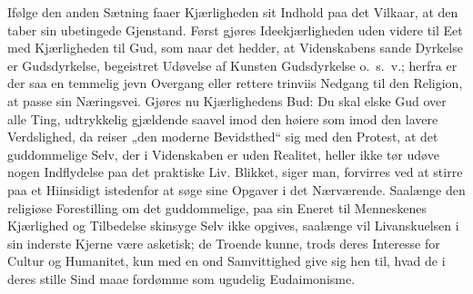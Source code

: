 \documentclass[12pt]{book}
\begin{document}
Ifølge den anden Sætning faaer Kjærligheden sit Indhold paa det
Vilkaar, at den taber sin ubetingede
Gjenstand. Først gjøres Ideekjærligheden uden videre til Eet med
Kjærligheden til Gud, som naar det hedder, at Videnskabens sande
Dyrkelse er Gudsdyrkelse, begeistret Udøvelse af Kunsten
Gudsdyrkelse o.\ s.\ v.; herfra er der saa en temmelig jevn Overgang
eller rettere trinviis Nedgang til den Religion, at passe sin
Næringsvei. Gjøres nu Kjærlighedens Bud: Du skal elske Gud over alle
Ting, udtrykkelig gjældende saavel imod den høiere som imod den
lavere Verdslighed, da reiser „den moderne Bevidsthed“ sig med den
Protest, at det guddommelige Selv, der i Videnskaben er uden
Realitet, heller ikke tør udøve nogen Indflydelse paa det praktiske
Liv. Blikket, siger man, forvirres ved at stirre paa et Hiinsidigt
istedenfor at søge sine Opgaver i det Nærværende. Saalænge den
religiøse Forestilling om det guddommelige, paa sin Eneret til
Menneskenes Kjærlighed og Tilbedelse skinsyge Selv ikke opgives,
saalænge vil Livanskuelsen i sin inderste Kjerne være asketisk; de
Troende kunne, trods deres Interesse for Cultur og Humanitet, kun
med en ond Samvittighed give sig hen til, hvad de i deres stille
Sind maae fordømme som ugudelig Eudaimonisme.
\end{document}
